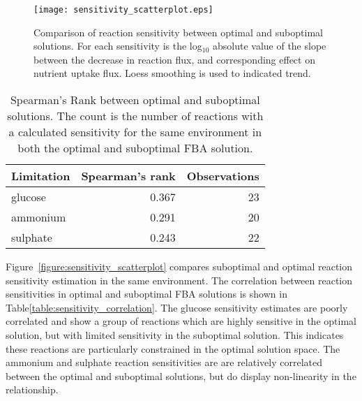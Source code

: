 
\begin{figure}%
  \centering
  \texttt{[image: sensitivity\_scatterplot.eps]}
  \caption[Comparison of reaction sensitivity between optimal and suboptimal solutions]{Comparison of reaction sensitivity between optimal and suboptimal solutions. For each sensitivity is the log$_10$ absolute value of the slope between the decrease in reaction flux, and corresponding effect on nutrient uptake flux. Loess smoothing is used to indicated trend. }
  \label{figure:sensitivity_scatterplot}
\end{figure}%

\begin{table}%
  \centering
  \begin{tabular}{l r r}
                                                    \toprule
    Limitation  & Spearman's rank & Observations \\ \midrule
    glucose     & 0.367           & 23           \\
    ammonium    & 0.291           & 20           \\
    sulphate    & 0.243           & 22           \\ \bottomrule
  \end{tabular}
  \caption[Spearman's Rank between optimal and suboptimal solutions]{Spearman's Rank between optimal and suboptimal solutions. The count is the number of reactions with a calculated sensitivity for the same environment in both the optimal and suboptimal FBA solution. }
  \label{table:sensitivity_correlation}
\end{table}%


Figure~\vref{figure:sensitivity_scatterplot} compares suboptimal and optimal reaction sensitivity estimation in the same environment. The correlation between reaction sensitivities in optimal and suboptimal FBA solutions is shown in Table\vref{table:sensitivity_correlation}. The glucose sensitivity estimates are poorly correlated and show a group of reactions which are highly sensitive in the optimal solution, but with limited sensitivity in the suboptimal solution. This indicates these reactions are particularly constrained in the optimal solution space. The ammonium and sulphate reaction sensitivities are are relatively correlated between the optimal and suboptimal solutions, but do display non-linearity in the relationship.

